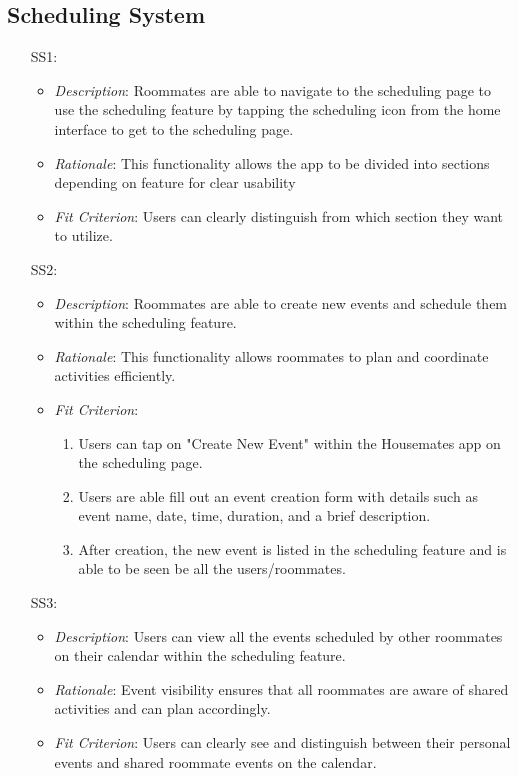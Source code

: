 \documentclass[12pt]{article}
\begin{document}
\subsection{Scheduling System}
\noindent \begin{itemize}
    \item[SS1: ]
\begin{itemize}
    \item \textit{Description}: Roommates are able to navigate to the scheduling page to use the scheduling feature by tapping the scheduling icon from the home interface to get to the scheduling page.
    \item \textit{Rationale}: This functionality allows the app to be divided into sections depending on feature for clear usability
    \item \textit{Fit Criterion}: Users can clearly distinguish from which section they want to utilize.
\end{itemize}
    
    \item[SS2: ]
\begin{itemize}
    \item \textit{Description}: Roommates are able to create new events and schedule them within the scheduling feature.
    \item \textit{Rationale}: This functionality allows roommates to plan and coordinate activities efficiently.
    \item \textit{Fit Criterion}:
    \begin{enumerate}
        \item Users can tap on "Create New Event"  within the Housemates app on the scheduling page.
        \item Users are able fill out an event creation form with details such as event name, date, time, duration, and a brief description.
        \item After creation, the new event is listed in the scheduling feature and is able to be seen be all the users/roommates.
    \end{enumerate}
\end{itemize}

\item[SS3: ]
\begin{itemize}
    \item \textit{Description}: Users can view all the events scheduled by other roommates on their calendar within the scheduling feature.
    \item \textit{Rationale}: Event visibility ensures that all roommates are aware of shared activities and can plan accordingly.
    \item \textit{Fit Criterion}: Users can clearly see and distinguish between their personal events and shared roommate events on the calendar.
\end{itemize}
    
\end{itemize}
\end{document}
